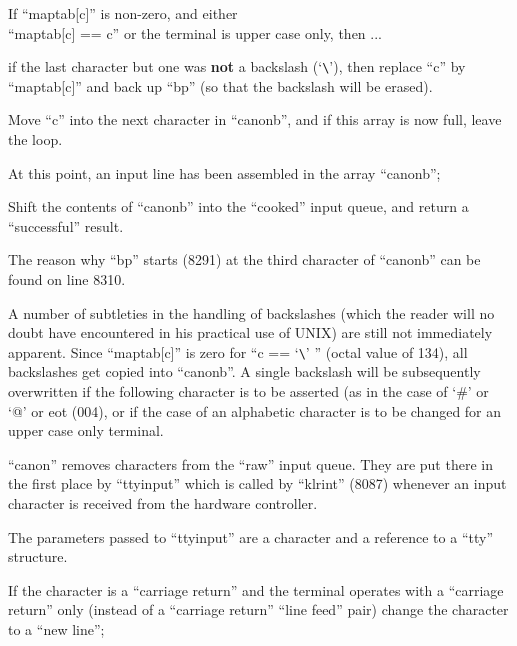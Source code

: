 \bd
\item[8309:] If ``maptab[c]'' is non-zero, and either\\
``maptab[c] == c'' or the
terminal is upper case only, then ...

\item[8310:] if the last character but one was
{\bf not} a backslash (`\verb+\+'), then
replace ``c'' by ``maptab[c]'' and
back up ``bp'' (so that the
backslash will be erased).
\ed


\bd
\item[8315:] Move ``c'' into the next character
in ``canonb'', and if this array is
now full, leave the loop.
\ed


\bd
\item[8319:] At this point, an input line has
been assembled in the array
``canonb'';

\item[8322:] Shift the contents of ``canonb''
into the ``cooked'' input queue,
and return a ``successful'' result.
\ed


\bd
\item[(A)] The reason why ``bp'' starts (8291)
at the third character of ``canonb'' can
be found on line 8310.

\item[(B)] A number of subtleties in
the handling of backslashes (which the reader
will no doubt have encountered in his
practical use of UNIX) are still not
immediately      apparent.        Since
``maptab[c]'' is zero for ``c == `\verb+\+' ''
(octal value of 134), all backslashes
get copied into ``canonb''. A single
backslash will be subsequently overwritten if the following character is
to be asserted (as in the case of `\#'
or `@' or eot (004), or if the case of
an alphabetic character is to be
changed for an upper case only terminal.
\ed


``canon'' removes characters from the
``raw'' input queue. They are put there
in the first place by ``ttyinput'' which
is called by ``klrint'' (8087) whenever
an input character is received from the
hardware controller.

The parameters passed to ``ttyinput'' are
a character and a reference to a ``tty''
structure.

\bd
\item[8342:] If the character is a ``carriage
return'' and the terminal operates
with a ``carriage return'' only
(instead of a ``carriage return''
``line feed'' pair) change the
character to a ``new line'';

